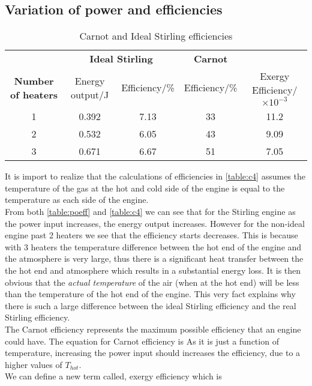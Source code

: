 \documentclass[10pt]{article}
\begin{document}
\subsection{Variation of power and efficiencies}
\begin{table}[h]
\centering\begin{tabular}{@{}ccccc@{}}
\toprule
&\multicolumn{2}{c}{\bfseries Ideal Stirling}
&\multicolumn{1}{c}{\bfseries Carnot} 
\\
\cmidrule(lr){2-3} \cmidrule(l){4-4} 
\bfseries Number of heaters 
& Energy output/J & Efficiency/\%
& Efficiency/\% & Exergy Efficiency/$\times 10^{-3}$
\\
\midrule
1 & 0.392 & 7.13 & 33 & 11.2 \\
2 & 0.532 & 6.05 & 43 & 9.09\\
3 & 0.671 & 6.67 & 51 & 7.05\\
\bottomrule
\end{tabular}
\caption{Carnot and Ideal Stirling efficiencies}
\label{table:c4}
\end{table}
\FloatBarrier
\noindent
It is import to realize that the calculations of efficiencies in \autoref{table:c4} assumes the temperature of the gas at the hot and cold side of the engine is equal to the temperature as each side of the engine.\\[1em]
\noindent
From both \autoref{table:poeff} and \autoref{table:c4} we can see that for the Stirling engine as the power input increases, the energy output increases. However for the non-ideal engine past 2 heaters we see that the efficiency starts decreases. This is because with 3 heaters the temperature difference between the hot end of the engine and the atmosphere is very large, thus there is a significant heat transfer between the the hot end and atmosphere which results in a substantial energy loss. It is then obvious that the \emph{actual temperature} of the air (when at the hot end) will be less than the temperature of the hot end of the engine. This very fact explains why there is such a large difference between the ideal Stirling efficiency and the real Stirling efficiency.\\
The Carnot efficiency represents the maximum possible efficiency that an engine could have. The equation for Carnot efficiency is
As it is just a function of temperature, increasing the power input should increases the efficiency, due to a higher values of $T_{hot}$.
\\
We can define a new term called, exergy efficiency which is 
\end{document}

